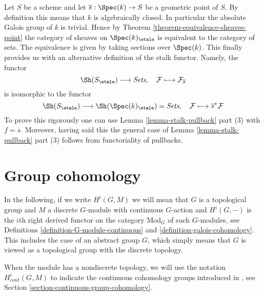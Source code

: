 \begin{remark}
\label{remark-stalk-pullback}
Let $S$ be a scheme and let $\overline{s} : \Spec(k) \to S$
be a geometric point of $S$. By definition this means that $k$
is algebraically closed. In particular the absolute Galois group of $k$
is trivial. Hence by
Theorem \ref{theorem-equivalence-sheaves-point}
the category of sheaves on $\Spec(k)_\etale$ is equivalent
to the category of sets. The equivalence is given by taking
sections over $\Spec(k)$. This finally provides us with an
alternative definition of the stalk functor. Namely, the functor
$$
\Sh(S_\etale) \longrightarrow \textit{Sets}, \quad
\mathcal{F} \longmapsto \mathcal{F}_{\overline{s}}
$$
is isomorphic to the functor
$$
\Sh(S_\etale)
\longrightarrow
\Sh(\Spec(k)_\etale) = \textit{Sets},
\quad
\mathcal{F} \longmapsto \overline{s}^*\mathcal{F}
$$
To prove this rigorously one can use
Lemma \ref{lemma-stalk-pullback} part (3)
with $f = \overline{s}$. Moreover, having said this the general case of
Lemma \ref{lemma-stalk-pullback} part (3)
follows from functoriality of pullbacks.
\end{remark}






\section{Group cohomology}
\label{section-group-cohomology}

\noindent
In the following, if we write $H^i(G, M)$ we will mean that $G$
is a topological group and $M$ a discrete $G$-module with
continuous $G$-action and $H^i(G, -)$ is the $i$th right derived
functor on the category $\text{Mod}_G$ of such $G$-modules, see
Definitions \ref{definition-G-module-continuous} and
\ref{definition-galois-cohomology}. This includes
the case of an abstract group $G$, which simply means that $G$ is viewed
as a topological group with the discrete topology.

\medskip\noindent
When the module has a nondiscrete topology, we will use the notation
$H^i_{cont}(G, M)$ to indicate the continuous cohomology groups
introduced in \cite{Tate}, see
Section \ref{section-continuous-group-cohomology}.

